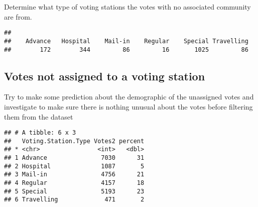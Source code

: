 \documentclass[
]{article}
\newenvironment{Shaded}{\begin{snugshade}}{\end{snugshade}}
\newcommand{\DataTypeTok}[1]{\textcolor[rgb]{0.13,0.29,0.53}{#1}}
\newcommand{\DecValTok}[1]{\textcolor[rgb]{0.00,0.00,0.81}{#1}}
\newcommand{\KeywordTok}[1]{\textcolor[rgb]{0.13,0.29,0.53}{\textbf{#1}}}
\newcommand{\NormalTok}[1]{#1}
\newcommand{\OperatorTok}[1]{\textcolor[rgb]{0.81,0.36,0.00}{\textbf{#1}}}
\newcommand{\StringTok}[1]{\textcolor[rgb]{0.31,0.60,0.02}{#1}}
\begin{document}
Determine what type of voting stations the votes with no associated
community are from.

\begin{Shaded}
\end{Shaded}

\begin{verbatim}
## 
##    Advance   Hospital    Mail-in    Regular    Special Travelling 
##        172        344         86         16       1025         86
\end{verbatim}

\hypertarget{votes-not-assigned-to-a-voting-station}{%
\subsection{Votes not assigned to a voting
station}\label{votes-not-assigned-to-a-voting-station}}

Try to make some prediction about the demographic of the unassigned
votes and investigate to make sure there is nothing unusual about the
votes before filtering them from the dataset

\begin{Shaded}
\end{Shaded}

\begin{verbatim}
## # A tibble: 6 x 3
##   Voting.Station.Type Votes2 percent
## * <chr>                <int>   <dbl>
## 1 Advance               7030      31
## 2 Hospital              1087       5
## 3 Mail-in               4756      21
## 4 Regular               4157      18
## 5 Special               5193      23
## 6 Travelling             471       2
\end{verbatim}
\end{document}
